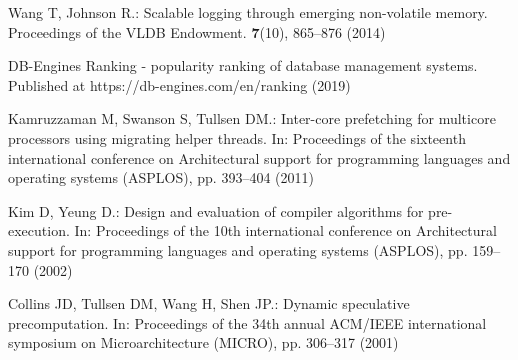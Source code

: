 Wang T, Johnson R.: Scalable logging through emerging non-volatile memory. Proceedings of the VLDB Endowment. \textbf{7}(10), 865--876 (2014)

DB-Engines Ranking - popularity ranking of database management systems. Published at https://db-engines.com/en/ranking (2019)

Kamruzzaman M, Swanson S, Tullsen DM.: Inter-core prefetching for multicore processors using migrating helper threads. In: Proceedings of the sixteenth international conference on Architectural support for programming languages and operating systems (ASPLOS), pp. 393--404 (2011)

Kim D, Yeung D.: Design and evaluation of compiler algorithms for pre-execution. In: Proceedings of the 10th international conference on Architectural support for programming languages and operating systems (ASPLOS), pp. 159--170  (2002)

Collins JD, Tullsen DM, Wang H, Shen JP.: Dynamic speculative precomputation. In: Proceedings of the 34th annual ACM/IEEE international symposium on Microarchitecture (MICRO), pp. 306--317 (2001)


